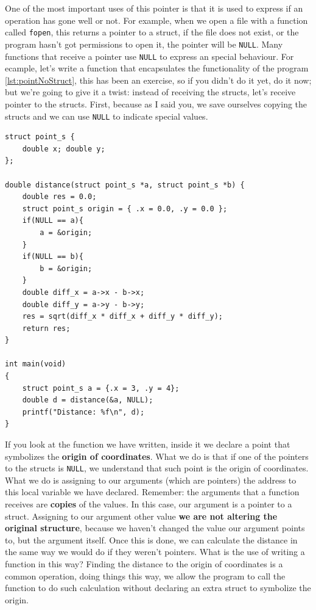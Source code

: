 \documentclass[a4paper]{article}
\begin{document}
One of the most important uses of this pointer is that it is used to express if
an operation has gone well or not. For example, when we open a file with a
function called \verb!fopen!, this returns a pointer to a struct, if the file
does not exist, or the program hasn't got permissions to open it, the pointer
will be \verb"NULL". Many functions that receive a pointer use \verb!NULL! to
express an special behaviour. For ecample, let's write a function that
encapsulates the functionality of the program \ref{lst:pointNoStruct}, this has
been an exercise, so if you didn't do it yet, do it now; but we're going to
give it a twist: instead of receiving the structs, let's receive pointer to the
structs. First, because as I said you, we save ourselves copying the structs and
we can use \verb!NULL! to indicate special values.

\noindent
\begin{minipage}[H]{\linewidth}
\mbox{}
\begin{lstlisting}[style=C, label={lst:nullPointers},
caption={Use of pointers to \texttt{NULL}}]
struct point_s {
    double x; double y;
};

double distance(struct point_s *a, struct point_s *b) {
    double res = 0.0;
    struct point_s origin = { .x = 0.0, .y = 0.0 };
    if(NULL == a){
        a = &origin;
    }
    if(NULL == b){
        b = &origin;
    }
    double diff_x = a->x - b->x;
    double diff_y = a->y - b->y;
    res = sqrt(diff_x * diff_x + diff_y * diff_y);
    return res;
}

int main(void)
{
    struct point_s a = {.x = 3, .y = 4};
    double d = distance(&a, NULL);
    printf("Distance: %f\n", d);
}
\end{lstlisting}
\end{minipage}

If you look at the function we have written, inside it we declare a point that
symbolizes the \textbf{origin of coordinates}. What we do is that if one of the
pointers to the structs is \verb!NULL!, we understand that such point is
the origin of coordinates. What we do is assigning to our arguments (which
are pointers) the address to this local variable we have declared. Remember:
the arguments that a function receives are \textbf{copies} of the values. In
this case, our argument is a pointer to a struct. Assigning to our argument
other value \textbf{we are not altering the original structure}, because we
haven't changed the value our argument points to, but the argument itself. Once
this is done, we can calculate the distance in the same way we would do if they
weren't pointers. What is the use of writing a function in this way? Finding
the distance to the origin of coordinates is a common operation, doing things
this way, we allow the program to call the function to do such calculation
without declaring an extra struct to symbolize the origin.
\end{document}
